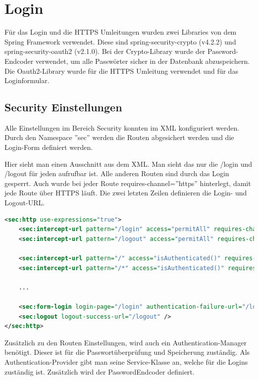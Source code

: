 \newpage

\section{Login}
Für das Login und die HTTPS Umleitungen wurden zwei Libraries von dem Spring Framework verwendet.
Diese sind spring-security-crypto (v4.2.2) und spring-security-oauth2 (v2.1.0). Bei der Crypto-Library wurde der Password-Endcoder verwendet, um alle Passwörter sicher in der Datenbank abzuspeichern. Die Oauth2-Library wurde für die HTTPS Umleitung verwendet und für das Loginformular.

\subsection{Security Einstellungen}
Alle Einstellungen im Bereich Security konnten im XML konfiguriert werden. Durch den Namespace ''sec'' werden die Routen abgesichert werden und die Login-Form definiert werden.

Hier sieht man einen Ausschnitt aus dem XML. Man sieht das nur die /login und /logout für jeden aufrufbar ist. Alle anderen Routen sind durch das Login gesperrt. Auch wurde bei jeder Route requires-channel=''https'' hinterlegt, damit jede Route über HTTPS läuft. Die zwei letzten Zeilen definieren die Login- und Logout-URL.
\begin{lstlisting}[language=xml]
<sec:http use-expressions="true">
	<sec:intercept-url pattern="/login" access="permitAll" requires-channel="https"/>
	<sec:intercept-url pattern="/logout" access="permitAll" requires-channel="https"/>
	
	<sec:intercept-url pattern="/" access="isAuthenticated()" requires-channel="https" />
	<sec:intercept-url pattern="/*" access="isAuthenticated()" requires-channel="https" />
	
	...
		
	<sec:form-login login-page="/login" authentication-failure-url="/login?error=true" />
	<sec:logout logout-success-url="/logout" />
</sec:http>
\end{lstlisting}

Zusätzlich zu den Routen Einstellungen, wird auch ein Authentication-Manager benötigt. Dieser ist für die Passwortüberprüfung und Speicherung zuständig. Als Authentication-Provider gibt man seine Service-Klasse an, welche für die Logins zuständig ist. Zusätzlich wird der PasswordEndcoder definiert.

